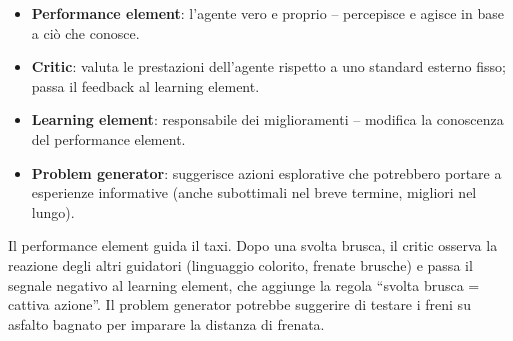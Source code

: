 \begin{center}
\end{center}

\begin{itemize}
    \item \textbf{Performance element}: l'agente vero e proprio -- percepisce e agisce in base a ciò che conosce.
    \item \textbf{Critic}: valuta le prestazioni dell'agente rispetto a uno standard esterno fisso; passa il feedback al learning element.
    \item \textbf{Learning element}: responsabile dei miglioramenti -- modifica la conoscenza del performance element.
    \item \textbf{Problem generator}: suggerisce azioni esplorative che potrebbero portare a esperienze informative (anche subottimali nel breve termine, migliori nel lungo).
\end{itemize}

\begin{exbox}
Il performance element guida il taxi. Dopo una svolta brusca, il critic osserva la reazione degli altri guidatori (linguaggio colorito, frenate brusche) e passa il segnale negativo al learning element, che aggiunge la regola ``svolta brusca = cattiva azione''. Il problem generator potrebbe suggerire di testare i freni su asfalto bagnato per imparare la distanza di frenata.
\end{exbox}


